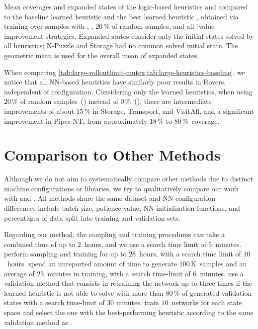 \begin{table}[tb]
    \caption[Results of the logic-based, baseline, and the best learned heuristics.]{Mean coverages and expanded states of the logic-based heuristics \hff and \hgc compared to the baseline learned heuristic \hnnbase and the best learned heuristic \hnnrs, obtained via training over samples with \bfsrw, \rlmeanfx, $20$\,\% of random samples, and all \h-value improvement strategies. Expanded states consider only the initial states solved by all heuristics; N-Puzzle and Storage had no common solved initial state. The geometric mean is used for the overall mean of expanded states.}
    \label{tab:large-heuristics-baseline}
    \addmargin
    \centering
    
\end{table}

When comparing \cref{tab:large-rolloutlimit-mutex,tab:large-heuristics-baseline}, we notice that all NN-based heuristics have similarly poor results in Rovers, independent of configuration. Considering only the learned heuristics, when using $20\,\%$ of random samples~(\hnnrs) instead of $0\,\%$~(\hnnl{\rlmeanfx}), there are intermediate improvements of about $15\,\%$ in Storage, Transport, and VisitAll, and a significant improvement in Pipes-NT, from approximately $18\,\%$ to $80\,\%$~coverage.

\section{Comparison to Other Methods}
\label{sec:large-exps-comparison}

Although we do not aim to systematically compare other methods due to distinct machine configurations or libraries, we try to qualitatively compare our work with \citet{ferber2022neural} and \citet{otoole2022sampling}. All methods share the same dataset and NN configuration -- differences include batch size, patience value, NN initialization functions, and percentages of data split into training and validation sets.

Regarding our method, the sampling and training procedures can take a combined time of up to $2$~hours, and we use a search time limit of $5$~minutes. \citet{ferber2022neural} perform sampling and training for up to $28$~hours, with a search time limit of $10$~hours. \citet{otoole2022sampling} spend an unreported amount of time to generate $100$\,K~samples and an average of $23$~minutes in training, with a search time-limit of $6$~minutes. \citet{ferber2022neural} use a validation method that consists in retraining the network up to three times if the learned heuristic is not able to solve with \gbfs more than $80\,\%$ of generated validation states with a search time-limit of $30$ minutes. \citet{otoole2022sampling} train $10$~networks for each state space and select the one with the best-performing heuristic according to the same validation method as \citet{ferber2022neural}.

